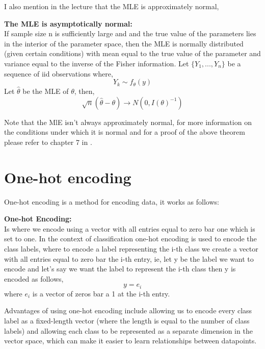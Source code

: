 I also mention in the lecture that the MLE is approximately normal,
\begin{theorem}
    \textbf{The MLE is asymptotically normal:} \\
    If sample size n is sufficiently large and and the true value of the parameters lies in the interior of the parameter space, then the MLE is normally distributed (given certain conditions) with mean equal to the true value of the parameter and variance equal to the inverse of the Fisher information. Let $\{Y_{1},...,Y_{n}\}$ be a sequence of iid observations where,
    \begin{equation}
        Y_{k} \sim f_{\theta}(y)
    \end{equation}
    Let $\hat{\theta}$ be the MLE of $\theta$, then,
    \begin{equation}
        \sqrt{n} (\hat{\theta} - \theta) \rightarrow N(0,I(\theta)^{-1})
    \end{equation}
\end{theorem}
Note that the MlE isn't always approximately normal, for more information on the conditions under which it is normal and for a proof of the above theorem please refer to chapter 7 in \cite{lehmann1999elements}.

\section{One-hot encoding}
One-hot encoding is a method for encoding data, it works as follows:
\begin{definition}
    \textbf{One-hot Encoding:} \\
    Is where we encode using a vector with all entries equal to zero bar one which is set to one. In the context of classification one-hot encoding is used to encode the class labels, where to encode a label representing the i-th class we create a vector with all entries equal to zero bar the i-th entry, ie, let y be the label we want to encode and let's say we want the label to represent the i-th class then y is encoded as follows,
    \begin{equation}
        y = e_{i}
    \end{equation}
    where $e_{i}$ is a vector of zeros bar a 1 at the i-th entry. 
\end{definition}
Advantages of using one-hot encoding include allowing us to encode every class label as a fixed-length vector (where the length is equal to the number of class labels) and allowing each class to be represented as a separate dimension in the vector space, which can make it easier to learn relationships between datapoints. 

